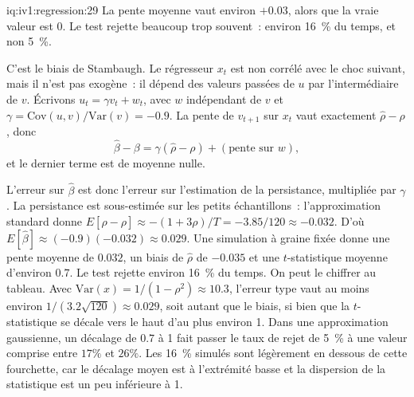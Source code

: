 \enlargethispage{-2\baselineskip}%
\begin{solution}{iq:iv1:regression:29}
La pente moyenne vaut environ $+0.03$, alors que la vraie valeur est 0. Le test rejette beaucoup trop souvent~: environ 16~\% du temps, et non 5~\%.

C'est le biais de Stambaugh. Le régresseur $x_t$ est non corrélé avec le choc suivant, mais il n'est pas exogène~: il dépend des valeurs passées de $u$ par l'intermédiaire de $v$. Écrivons $u_t = \gamma v_t + w_t$, avec $w$ indépendant de $v$ et $\gamma = \mathrm{Cov}(u, v)/\mathrm{Var}(v) = -0.9$. La pente de $v_{t+1}$ sur $x_t$ vaut exactement $\hat\rho - \rho$, donc
\[
\hat\beta - \beta = \gamma(\hat\rho - \rho) + (\text{pente sur } w),
\]
et le dernier terme est de moyenne nulle.

L'erreur sur $\hat\beta$ est donc l'erreur sur l'estimation de la persistance, multipliée par $\gamma$. La persistance est sous-estimée sur les petits échantillons~: l'approximation standard donne $E[\hat\rho - \rho] \approx -(1 + 3\rho)/T = -3.85/120 \approx -0.032$. D'où $E[\hat\beta] \approx (-0.9)(-0.032) \approx 0.029$. Une simulation à graine fixée donne une pente moyenne de $0.032$, un biais de $\hat\rho$ de $-0.035$ et une $t$-statistique moyenne d'environ $0.7$. Le test rejette environ 16~\% du temps. On peut le chiffrer au tableau. Avec $\mathrm{Var}(x) = 1/(1 - \rho^2) \approx 10.3$, l'erreur type vaut au moins environ $1/(3.2\sqrt{120}) \approx 0.029$, soit autant que le biais, si bien que la $t$-statistique se décale vers le haut d'au plus environ 1. Dans une approximation gaussienne, un décalage de $0.7$ à 1 fait passer le taux de rejet de 5~\% à une valeur comprise entre $17\%$ et $26\%$. Les 16~\% simulés sont légèrement en dessous de cette fourchette, car le décalage moyen est à l'extrémité basse et la dispersion de la statistique est un peu inférieure à 1.

\end{solution}

